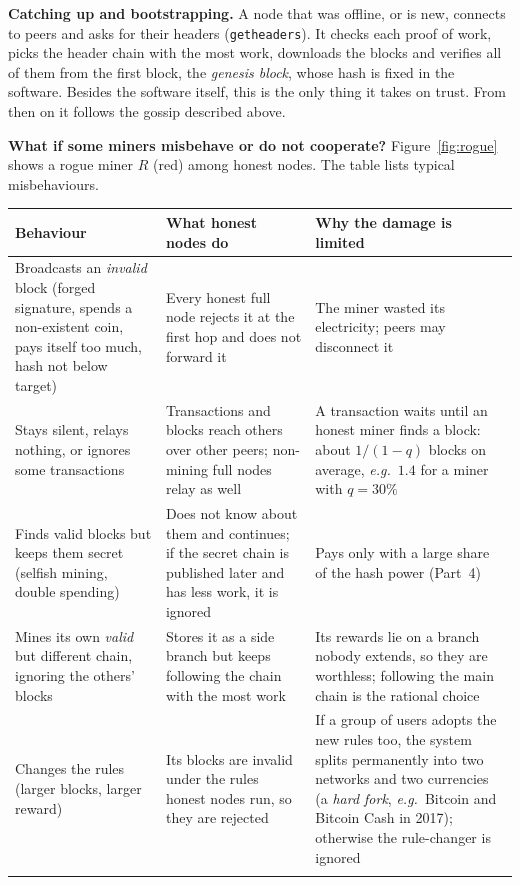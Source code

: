 \documentclass[11pt,a4paper]{article}
\theoremstyle{definition}
\theoremstyle{plain}
\theoremstyle{remark}
\newcommand{\eg}{\textit{e.g.}}
\begin{document}
\textbf{Catching up and bootstrapping.} A node that was offline, or is new, connects to peers and asks for their headers (\texttt{getheaders}). It checks each proof of work, picks the header chain with the most work, downloads the blocks and verifies all of them from the first block, the \emph{genesis block}, whose hash is fixed in the software. Besides the software itself, this is the only thing it takes on trust. From then on it follows the gossip described above.

\textbf{What if some miners misbehave or do not cooperate?} Figure~\ref{fig:rogue} shows a rogue miner $R$ (red) among honest nodes. The table lists typical misbehaviours.

\begin{center}
\footnotesize\renewcommand{\arraystretch}{1.05}
\begin{tabular}{@{}p{3.6cm}p{5.6cm}p{6.0cm}@{}}
\toprule
\textbf{Behaviour} & \textbf{What honest nodes do} & \textbf{Why the damage is limited}\\
\midrule
Broadcasts an \emph{invalid} block (forged signature, spends a non-existent coin, pays itself too much, hash not below target) & Every honest full node rejects it at the first hop and does not forward it & The miner wasted its electricity; peers may disconnect it\\\addlinespace[4pt]
Stays silent, relays nothing, or ignores some transactions & Transactions and blocks reach others over other peers; non-mining full nodes relay as well & A transaction waits until an honest miner finds a block: about $1/(1-q)$ blocks on average, \eg\ $1.4$ for a miner with $q=30\%$\\\addlinespace[4pt]
Finds valid blocks but keeps them secret (selfish mining, double spending) & Does not know about them and continues; if the secret chain is published later and has less work, it is ignored & Pays only with a large share of the hash power (Part~4)\\\addlinespace[4pt]
Mines its own \emph{valid} but different chain, ignoring the others' blocks & Stores it as a side branch but keeps following the chain with the most work & Its rewards lie on a branch nobody extends, so they are worthless; following the main chain is the rational choice\\\addlinespace[4pt]
Changes the rules (larger blocks, larger reward) & Its blocks are invalid under the rules honest nodes run, so they are rejected & If a group of users adopts the new rules too, the system splits permanently into two networks and two currencies (a \emph{hard fork}, \eg\ Bitcoin and Bitcoin Cash in 2017); otherwise the rule-changer is ignored\\\addlinespace[4pt]

\end{tabular}
\end{center}
\end{document}
